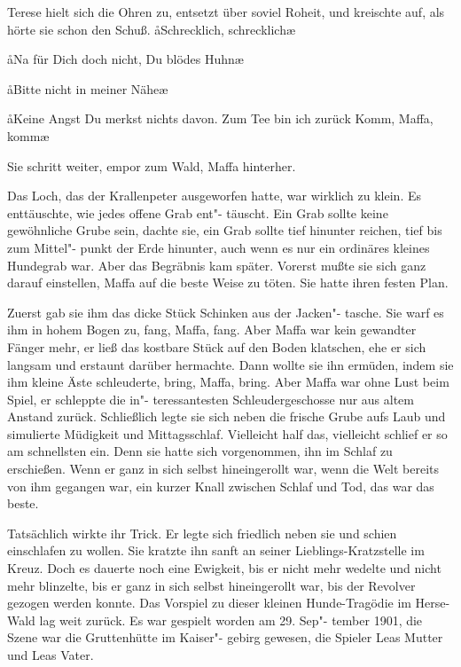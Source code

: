 Terese hielt sich die Ohren zu, entsetzt über soviel Roheit, und
kreischte auf, als hörte sie schon den Schuß. \aa{}Schrecklich,
schrecklich\ausr{}\ae{}

\aa{}Na für Dich doch nicht, Du blödes Huhn\ausr{}\ae{}

\aa{}Bitte nicht in meiner Nähe\ausr{}\ae{}

\aa{}Keine Angst\ausr{} Du merkst nichts davon. Zum Tee bin ich
zurück\punkte{} Komm, Maffa, komm\ausr{}\ae{}

Sie schritt weiter, empor zum Wald, Maffa hinterher.

Das Loch, das der Krallenpeter ausgeworfen hatte, war
wirklich zu klein. Es enttäuschte, wie jedes offene Grab ent"-%
täuscht. Ein Grab sollte keine gewöhnliche Grube sein, dachte
sie, ein Grab sollte tief hinunter reichen, tief bis zum Mittel"-%
punkt der Erde hinunter, auch wenn es nur ein ordinäres
kleines Hundegrab war. Aber das Begräbnis kam später.
Vorerst mußte sie sich ganz darauf einstellen, Maffa auf die
beste Weise zu töten. Sie hatte ihren festen Plan.

Zuerst gab sie ihm das dicke Stück Schinken aus der Jacken"-%
tasche. Sie warf es ihm in hohem Bogen zu, fang, Maffa,
fang. Aber Maffa war kein gewandter Fänger mehr, er ließ
das kostbare Stück auf den Boden klatschen, ehe er sich langsam
und erstaunt darüber hermachte. Dann wollte sie ihn ermüden,
indem sie ihm kleine Äste schleuderte, bring, Maffa, bring.
Aber Maffa war ohne Lust beim Spiel, er schleppte die in"-%
teressantesten Schleudergeschosse nur aus altem Anstand
zurück. Schließlich legte sie sich neben die frische Grube aufs
Laub und simulierte Müdigkeit und Mittagsschlaf. Vielleicht
half das, vielleicht schlief er so am schnellsten ein. Denn sie
hatte sich vorgenommen, ihn im Schlaf zu erschießen. Wenn
er ganz in sich selbst hineingerollt war, wenn die Welt bereits
von ihm gegangen war, ein kurzer Knall zwischen Schlaf und
Tod, das war das beste.

Tatsächlich wirkte ihr Trick. Er legte sich friedlich neben sie
und schien einschlafen zu wollen. Sie kratzte ihn sanft an seiner
Lieblings-Kratzstelle im Kreuz. Doch es dauerte noch eine
Ewigkeit, bis er nicht mehr wedelte und nicht mehr blinzelte,
bis er ganz in sich selbst hineingerollt war, bis der Revolver
gezogen werden konnte.
\abstanddrei{}
Das Vorspiel zu dieser kleinen Hunde-Tragödie im Herse-%
Wald lag weit zurück. Es war gespielt worden am 29. Sep"-%
tember 1901, die Szene war die Gruttenhütte im Kaiser"-%
gebirg gewesen, die Spieler Leas Mutter und Leas Vater.

